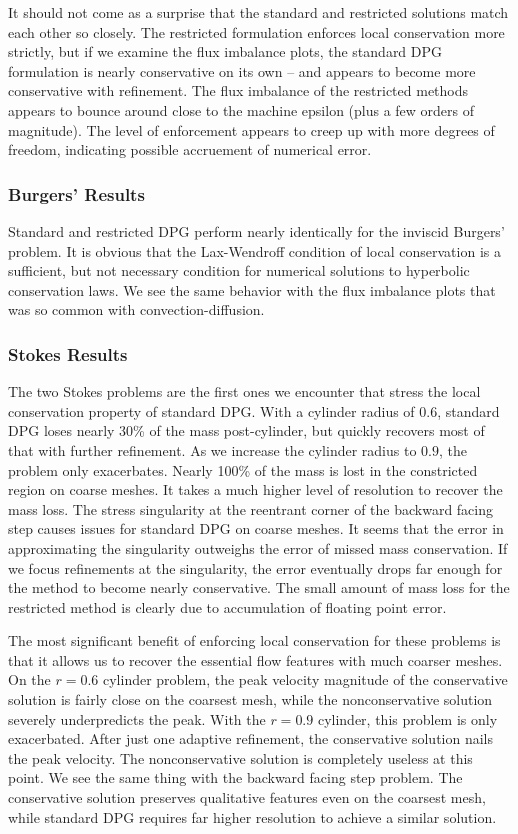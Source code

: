\documentclass[letterpaper]{article}
\begin{document}
It should not come as a surprise that the standard and restricted
solutions match each other so closely. The restricted formulation
enforces local conservation more strictly, but if we examine the flux
imbalance plots, the standard DPG formulation is nearly conservative on its
own -- and appears to become more conservative with refinement. The flux
imbalance of the restricted methods appears to bounce around close to the
machine epsilon (plus a few orders of magnitude). The level of enforcement
appears to creep up with more degrees of freedom, indicating possible
accruement of numerical error.

\subsubsection{Burgers' Results}
Standard and restricted DPG perform nearly identically for the
inviscid Burgers' problem. It is obvious that the Lax-Wendroff condition of
local conservation is a sufficient, but not necessary condition for numerical
solutions to hyperbolic conservation laws. We see the same behavior with the
flux imbalance plots that was so common with convection-diffusion.

\subsubsection{Stokes Results}
The two Stokes problems are the first ones we encounter that stress the local
conservation property of standard DPG. With a cylinder radius of $0.6$,
standard DPG loses nearly 30\% of the mass post-cylinder, but quickly recovers
most of that with further refinement. As we increase the cylinder radius to
$0.9$, the problem only exacerbates. Nearly 100\% of the mass is lost in the
constricted region on coarse meshes. It takes a much higher level of
resolution to recover the mass loss. The stress singularity at the reentrant
corner of the backward facing step causes issues for standard DPG on coarse
meshes. It seems that the error in approximating the singularity outweighs the
error of missed mass conservation. If we focus refinements at the singularity,
the error eventually drops far enough for the method to become nearly
conservative.
The small amount of mass loss for the restricted method is clearly due to
accumulation of floating point error.

The most significant benefit of enforcing local conservation for these
problems is that it allows us to recover the essential flow features with much
coarser meshes. On the $r=0.6$ cylinder problem, the peak velocity magnitude
of the conservative solution is fairly close on the coarsest mesh, while the
nonconservative solution severely underpredicts the peak. With the $r=0.9$
cylinder, this problem is only exacerbated. After just one adaptive
refinement, the conservative solution nails the peak velocity. The
nonconservative solution is completely useless at this point. We see the same
thing with the backward facing step problem. The conservative solution preserves
qualitative features even on the coarsest mesh, while standard DPG requires far higher resolution
to achieve a similar solution. 
\end{document}
